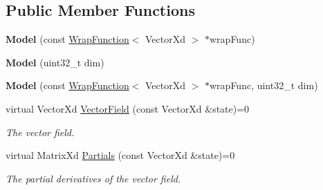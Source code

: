 \subsection*{Public Member Functions}
\begin{DoxyCompactItemize}
\item 
\hypertarget{struct_d_r_d_s_p_1_1_model_af9ab80237f807fecc435534c8705ea8c}{{\bfseries Model} (const \hyperlink{struct_d_r_d_s_p_1_1_wrap_function}{Wrap\-Function}$<$ Vector\-Xd $>$ $\ast$wrap\-Func)}\label{struct_d_r_d_s_p_1_1_model_af9ab80237f807fecc435534c8705ea8c}

\item 
\hypertarget{struct_d_r_d_s_p_1_1_model_a79dabe991f920ca21ac23066270ab1b7}{{\bfseries Model} (uint32\-\_\-t dim)}\label{struct_d_r_d_s_p_1_1_model_a79dabe991f920ca21ac23066270ab1b7}

\item 
\hypertarget{struct_d_r_d_s_p_1_1_model_a6e682e5b23ddca692c45a3bc6be9dd15}{{\bfseries Model} (const \hyperlink{struct_d_r_d_s_p_1_1_wrap_function}{Wrap\-Function}$<$ Vector\-Xd $>$ $\ast$wrap\-Func, uint32\-\_\-t dim)}\label{struct_d_r_d_s_p_1_1_model_a6e682e5b23ddca692c45a3bc6be9dd15}

\item 
\hypertarget{struct_d_r_d_s_p_1_1_model_a3dd65a7f5c3b1e5e89920a309ff2abec}{virtual Vector\-Xd \hyperlink{struct_d_r_d_s_p_1_1_model_a3dd65a7f5c3b1e5e89920a309ff2abec}{Vector\-Field} (const Vector\-Xd \&state)=0}\label{struct_d_r_d_s_p_1_1_model_a3dd65a7f5c3b1e5e89920a309ff2abec}

\begin{DoxyCompactList}\small\item\em The vector field. \end{DoxyCompactList}\item 
\hypertarget{struct_d_r_d_s_p_1_1_model_a36f5e07d59e484b0ddfc12ed820e55d1}{virtual Matrix\-Xd \hyperlink{struct_d_r_d_s_p_1_1_model_a36f5e07d59e484b0ddfc12ed820e55d1}{Partials} (const Vector\-Xd \&state)=0}\label{struct_d_r_d_s_p_1_1_model_a36f5e07d59e484b0ddfc12ed820e55d1}

\begin{DoxyCompactList}\small\item\em The partial derivatives of the vector field. \end{DoxyCompactList}\end{DoxyCompactItemize}
